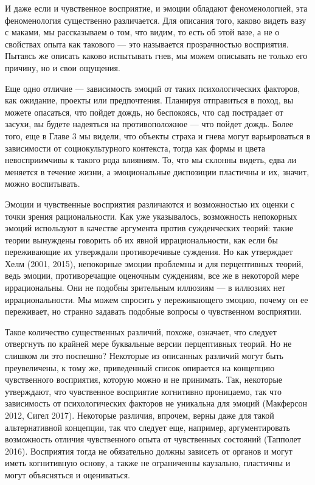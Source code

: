 \documentclass[11pt]{book}
\begin{document}
И даже если и чувственное восприятие, и эмоции обладают феноменологией, эта феноменология существенно различается. Для описания того, каково видеть вазу с маками, мы рассказываем о том, что видим, то есть об этой вазе, а не о свойствах опыта как такового --- это называется прозрачностью восприятия. Пытаясь же описать каково испытывать гнев, мы можем описывать не только его причину, но и свои ощущения.

Еще одно отличие --- зависимость эмоций от таких психологических факторов, как ожидание, проекты или предпочтения. Планируя отправиться в поход, вы можете опасаться, что пойдет дождь, но беспокоясь, что сад пострадает от засухи, вы будете надеяться на противоположное --- что пойдет дождь. Более того, еще в Главе 3 мы видели, что объекты страха и гнева могут варьироваться в зависимости от социокультурного контекста, тогда как формы и цвета невосприимчивы к такого рода влияниям. То, что мы склонны видеть, едва ли меняется в течение жизни, а эмоциональные диспозиции пластичны и их, значит, можно воспитывать.

Эмоции и чувственные восприятия различаются и возможностью их оценки с точки зрения рациональности. Как уже указывалось, возможность непокорных эмоций используют в качестве аргумента против сужденческих теорий: такие теории вынуждены говорить об их явной иррациональности, как если бы переживающие их утверждали противоречивые суждения. Но как утверждает Хелм (2001, 2015), непокорные эмоции проблемны и для перцептивных теорий, ведь эмоции, противоречащие оценочным суждениям, все же в некоторой мере иррациональны. Они не подобны зрительным иллюзиям --- в иллюзиях нет иррациональности. Мы можем спросить у переживающего эмоцию, почему он ее переживает, но странно задавать подобные вопросы о чувственном восприятии.

Такое количество существенных различий, похоже, означает, что следует отвергнуть по крайней мере буквальные версии перцептивных теорий. Но не слишком ли это поспешно? Некоторые из описанных различий могут быть преувеличены, к тому же, приведенный список опирается на концепцию чувственного восприятия, которую можно и не принимать. Так, некоторые утверждают, что чувственное восприятие когнитивно проницаемо, так что зависимость от психологических факторов не уникальна для эмоций (Макферсон 2012, Сигел 2017). Некоторые различия, впрочем, верны даже для такой альтернативной концепции, так что следует еще, например, аргументировать возможность отличия чувственного опыта от чувственных состояний (Тапполет 2016). Восприятия тогда не обязательно должны зависеть от органов и могут иметь когнитивную основу, а также не ограниченны каузально, пластичны и могут объясняться и оцениваться.
\end{document}
